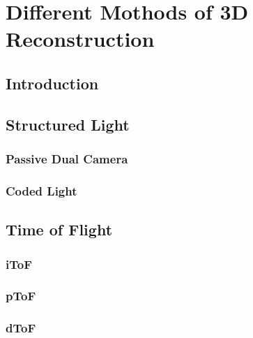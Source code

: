  

\chapter[Reconstruction the 3D world]{Different Mothods of 3D Reconstruction}

\section{Introduction}
\section{Structured Light}
\subsection{Passive Dual Camera}
\subsection{Coded Light}
\section{Time of Flight}
\subsection{iToF}
\subsection{pToF}
\subsection{dToF}

